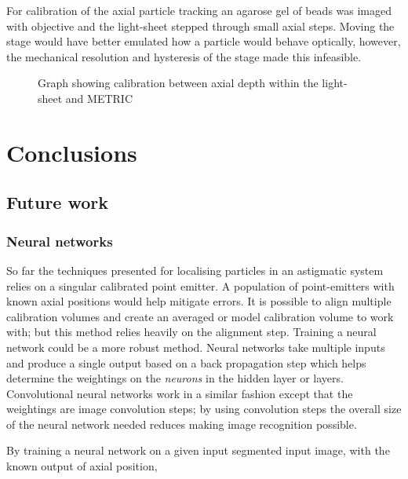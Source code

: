 For calibration of the axial particle tracking an agarose gel of beads was imaged with objective and the light-sheet stepped through small axial steps.
Moving the stage would have better emulated how a particle would behave optically, however, the mechanical resolution and hysteresis of the stage made this infeasible.

\begin{figure}
  \centering
  \caption{Graph showing calibration between axial depth within the light-sheet and METRIC}
  \label{}
\end{figure}

\section{Conclusions}


\subsection{Future work}

\subsubsection{Neural networks} %

So far the techniques presented for localising particles in an astigmatic system relies on a singular calibrated point emitter.
A population of point-emitters with known axial positions would help mitigate errors.
It is possible to align multiple calibration volumes and create an averaged or model calibration volume to work with; but this method relies heavily on the alignment step.
Training a neural network could be a more robust method.
Neural networks take multiple inputs and produce a single output based on a back propagation step which helps determine the weightings on the \emph{neurons} in the hidden layer or layers.
Convolutional neural networks work in a similar fashion except that the weightings are image convolution steps; by using convolution steps the overall size of the neural network needed reduces making image recognition possible.

By training a neural network on a given input segmented input image, with the known output of axial position,

